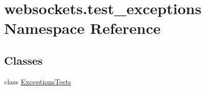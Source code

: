 \hypertarget{namespacewebsockets_1_1test__exceptions}{}\section{websockets.\+test\+\_\+exceptions Namespace Reference}
\label{namespacewebsockets_1_1test__exceptions}
\subsection*{Classes}
\begin{DoxyCompactItemize}
\item 
class \hyperlink{classwebsockets_1_1test__exceptions_1_1_exceptions_tests}{Exceptions\+Tests}
\end{DoxyCompactItemize}

